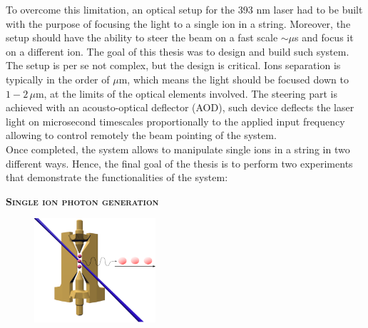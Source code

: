 \documentclass[english, a4paper, 12pt, twoside]{book}
\numberwithin{equation}{section} %
\begin{document}
To overcome this limitation, an optical setup for the 393 nm laser had to be built with the purpose of focusing the light to a single ion in a string. Moreover, the setup should have the ability to steer the beam on a fast scale $\sim\mu$s and focus it on a different ion. The goal of this thesis was to design and build such system. The setup is per se not complex, but the design is critical. Ions separation is typically in the order of $\mu$m, which means the light should be focused down to $1-2\,\mu$m, at the limits of the optical elements involved. The steering part is achieved with an acousto-optical deflector (AOD), such device deflects the laser light on microsecond timescales proportionally to the applied input frequency allowing to control remotely the beam pointing of the system.\\
Once completed, the system allows to manipulate single ions in a string in two different ways. Hence, the final goal of the thesis is to perform two experiments that demonstrate the functionalities of the system:\vspace{-1em}\newline
\begin{center}{\large\textbf{\textsc{Single ion photon generation}}}\end{center}
\begin{figure}
  \begin{center}
    \includegraphics[width=0.4\textwidth]{photongeneration2}
  \end{center}
\end{figure}
\end{document}

